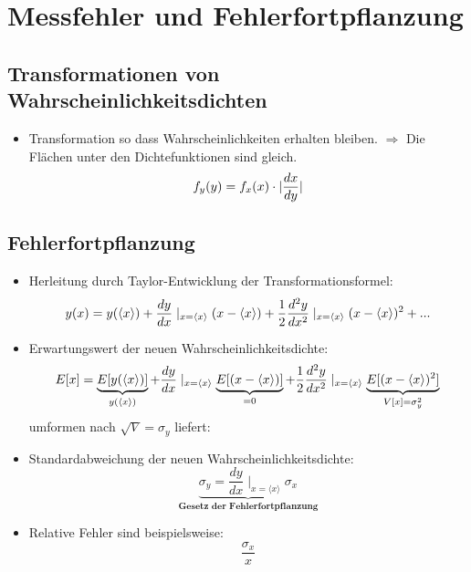 \documentclass[10pt,a4paper]{article}
\begin{document}
\newpage
\section{Messfehler und Fehlerfortpflanzung}
\subsection{Transformationen von Wahrscheinlichkeitsdichten}
\begin{itemize}
\item Transformation so dass Wahrscheinlichkeiten erhalten bleiben. $\Rightarrow$ Die Flächen unter den Dichtefunktionen sind gleich. 
\begin{equation}
f_y(y) = f_x(x) \cdot |\frac{dx}{dy}| \notag
\end{equation}
\end{itemize}


\subsection{Fehlerfortpflanzung}
\begin{itemize}
\item Herleitung durch Taylor-Entwicklung der Transformationsformel:
\begin{equation}
y(x) = y(\langle x \rangle)+ \frac{dy}{dx}\mid_{x=\langle x \rangle} (x-\langle x \rangle) + \frac{1}{2} \frac{d^2y}{dx^2}\mid_{x=\langle x \rangle} (x-\langle x \rangle)^2+... \notag
\end{equation}

\item Erwartungswert der neuen Wahrscheinlichkeitsdichte:
\begin{equation}
E[x]=\underbrace{E[y(\langle x \rangle)]}_{y(\langle x \rangle)}+ \frac{dy}{dx}\mid_{x=\langle x \rangle} \underbrace{E[(x-\langle x \rangle)]}_{=0} + \frac{1}{2} \frac{d^2y}{dx^2}\mid_{x=\langle x \rangle} \underbrace{E[(x-\langle x \rangle)^2]}_{V[x]=\sigma^2_y} \notag
\end{equation}
umformen nach $\sqrt{V}=\sigma_y$ liefert:
\item Standardabweichung der neuen Wahrscheinlichkeitsdichte:
\begin{equation}
\underbrace{\sigma_y=\frac{dy}{dx}\mid_{x=\langle x \rangle} \sigma_x}_{\textbf{Gesetz der Fehlerfortpflanzung}}
\end{equation}
\item Relative Fehler sind beispielsweise:
\begin{equation}
\frac{\sigma_x}{x}
\end{equation}
\end{itemize}
\end{document}

